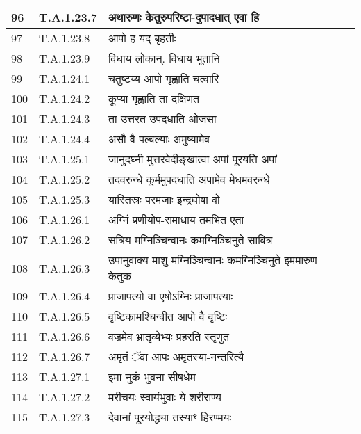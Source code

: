 \documentclass[17pt]{extarticle}
\begin{document}
\begin{longtable}{||p{0.4in}||p{0.9in}||p{4.0in}||p{0.9in}||}
        \hline
            96 & T.A.1.23.7 & अथारुणः केतुरुपरिष्टा{-}दुपादधात् एवा हि &      \\
        \hline
            97 & T.A.1.23.8 & आपो ह यद् बृहतीः &      \\
        \hline
            98 & T.A.1.23.9 & विधाय लोकान्. विधाय भूतानि &      \\
        \hline
            99 & T.A.1.24.1 & चतुष्टय्य आपो गृह्णाति चत्वारि &      \\
        \hline
            100 & T.A.1.24.2 & कूप्या गृह्णाति ता दक्षिणत &      \\
        \hline
            101 & T.A.1.24.3 & ता उत्तरत उपदधाति ओजसा &      \\
        \hline
            102 & T.A.1.24.4 & असौ वै पल्वल्याः अमुष्यामेव &      \\
        \hline
            103 & T.A.1.25.1 & जानुदघ्नी{-}मुत्तरवेदीङ्खात्वा अपां पूरयति अपां &      \\
        \hline
            104 & T.A.1.25.2 & तदवरुन्धे कूर्ममुपदधाति अपामेव मेधमवरुन्धे &      \\
        \hline
            105 & T.A.1.25.3 & यास्तिस्रः परमजाः इन्द्रघोषा वो &      \\
        \hline
            106 & T.A.1.26.1 & अग्निं प्रणीयोप{-}समाधाय तमभित एता &      \\
        \hline
            107 & T.A.1.26.2 & सत्रिय मग्निञ्चिन्वानः कमग्निञ्चिनुते सावित्र &      \\
        \hline
            108 & T.A.1.26.3 & उपानुवाक्य{-}माशु मग्निञ्चिन्वानः कमग्निञ्चिनुते इममारुण{-}केतुक &      \\
        \hline
            109 & T.A.1.26.4 & प्राजापत्यो वा एषोऽग्निः प्राजापत्याः &      \\
        \hline
            110 & T.A.1.26.5 & वृष्टिकामश्चिन्वीत आपो वै वृष्टिः &      \\
        \hline
            111 & T.A.1.26.6 & वज्रमेव भ्रातृव्येभ्यः प्रहरति स्तृणुत &      \\
        \hline
            112 & T.A.1.26.7 & अमृतं ॅवा आपः अमृतस्या{-}नन्तरित्यै &      \\
        \hline
            113 & T.A.1.27.1 & इमा नुकं भुवना सीषधेम &      \\
        \hline
            114 & T.A.1.27.2 & मरीचयः स्वायंभुवाः ये शरीराण्य &      \\
        \hline
            115 & T.A.1.27.3 & देवानां पूरयोद्ध्या तस्याꣳ हिरण्मयः &      \\

\end{longtable}
\end{document}
